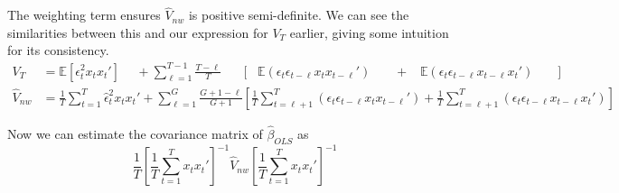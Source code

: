 \documentclass[DIV=14,titlepage=false]{scrreprt}
\begin{document}
 The weighting term ensures $\hat V_{nw}$ is positive semi-definite. We can see the similarities between this and our expression for $V_T$ earlier, giving some intuition for its consistency. 
\begin{align*}
    V_T &= \mathbb{E}[\epsilon_t^2x_tx_t'] \hspace{15pt} +  \sum_{\ell=1}^{T-1} \frac{T-\ell}{T} \hspace{21pt}\Bigg[ \hspace{10pt}\mathbb{E}(\epsilon_t\epsilon_{t-\ell} x_t x_{t-\ell}') \hspace{22pt}+ \hspace{10pt} \mathbb{E}(\epsilon_t\epsilon_{t-\ell} x_{t-\ell}x_t')\hspace{23pt}\Bigg] \\
    \hat V_{nw} &= \frac{1}{T}\sum_{t=1}^{T} \hat\epsilon_t^2 x_tx_t' + \sum_{\ell=1}^{G}\frac{G+1-\ell}{G+1} \left[\frac{1}{T}\sum_{t=\ell+1}^{T}\left(\epsilon_t\epsilon_{t-\ell} x_t x_{t-\ell}'\right) + \frac{1}{T}\sum_{t=\ell+1}^{T}\left(\epsilon_t\epsilon_{t-\ell} x_{t-\ell}x_t'\right)\right]
\end{align*}

Now we can estimate the covariance matrix of $\hat \beta_{OLS}$ as
\[
\frac{1}{T}\left[ \frac{1}{T} \sum_{t=1}^{T}x_tx_t'\right]^{-1}\hat V_{nw}  \left[ \frac{1}{T} \sum_{t=1}^{T}x_tx_t'\right]^{-1}  
\]
\end{document}
